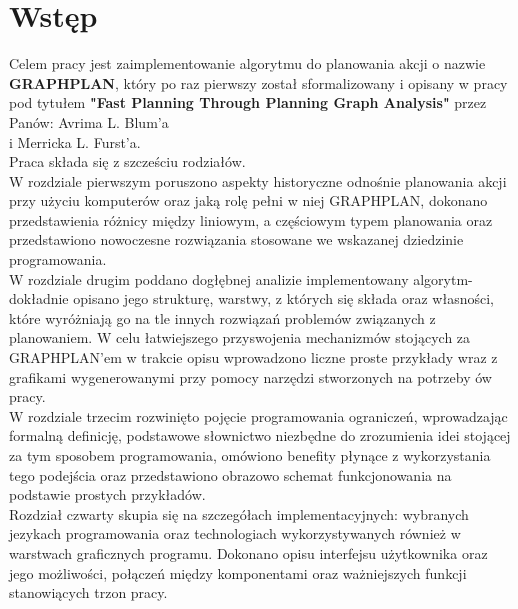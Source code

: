 \chapter*{Wstęp}

\thispagestyle{chapterBeginStyle}

Celem pracy jest zaimplementowanie algorytmu do planowania akcji o nazwie \textbf{GRAPHPLAN}, który po raz pierwszy został sformalizowany i opisany w pracy pod tytułem
\textbf{"Fast Planning Through Planning Graph Analysis"}\cite{GRAPHPLAN} przez Panów: Avrima L. Blum'a \\
i Merricka L. Furst'a.
\\
Praca składa się z szcześciu rodziałów.
\\

	W rozdziale pierwszym poruszono aspekty historyczne odnośnie planowania akcji przy użyciu komputerów oraz jaką rolę pełni w niej GRAPHPLAN,
dokonano przedstawienia różnicy między liniowym, a częściowym typem planowania oraz przedstawiono nowoczesne rozwiązania stosowane we wskazanej dziedzinie programowania.
\\

	W rozdziale drugim poddano dogłębnej analizie implementowany algorytm- dokładnie opisano jego strukturę, warstwy, z których się składa oraz własności,
które wyróżniają go na tle innych rozwiązań problemów związanych z planowaniem. W celu łatwiejszego przyswojenia mechanizmów stojących
za GRAPHPLAN'em w trakcie opisu wprowadzono liczne proste przykłady wraz z grafikami wygenerowanymi przy pomocy narzędzi stworzonych
na potrzeby ów pracy.
\\

	W rozdziale trzecim rozwinięto pojęcie programowania ograniczeń, wprowadzając formalną definicję, podstawowe słownictwo niezbędne do 
	zrozumienia idei stojącej za tym sposobem programowania, omówiono benefity płynące z wykorzystania tego podejścia oraz przedstawiono
	obrazowo schemat funkcjonowania na podstawie prostych przykładów.
\\

	Rozdział czwarty skupia się na szczegółach implementacyjnych: wybranych jezykach programowania oraz technologiach wykorzystywanych również
w warstwach graficznych programu. Dokonano opisu interfejsu użytkownika oraz jego możliwości, połączeń między komponentami oraz 
ważniejszych funkcji stanowiących trzon pracy.
\\

